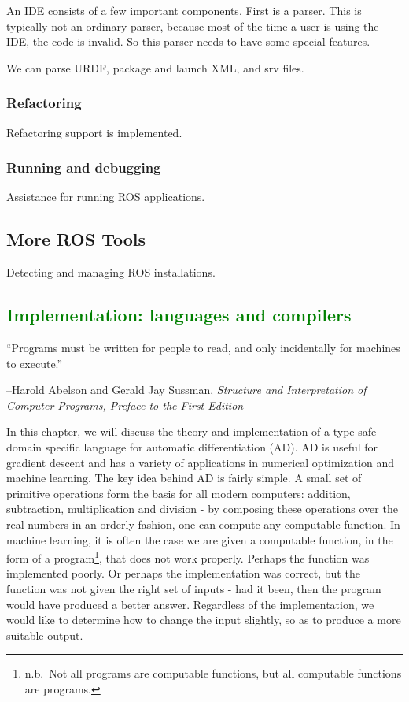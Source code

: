 \documentclass[12pt,initial,twoside,maitrise]{dms}
\newcommand{\mediumwell}[1]{\textcolor{green}{#1}}
\numberwithin{equation}{section}
\numberwithin{table}{chapter}
\numberwithin{figure}{chapter}
\begin{document}
An IDE consists of a few important components. First is a parser. This is typically not an ordinary parser, because most of the time a user is using the IDE, the code is invalid. So this parser needs to have some special features.

We can parse URDF, package and launch XML, and srv files.

\subsection{Refactoring}

Refactoring support is implemented.

\subsection{Running and debugging}

Assistance for running ROS applications.

\section{More ROS Tools}

Detecting and managing ROS installations.

\mediumwell{\chapter{Implementation: languages and compilers}\label{ch:kotlingrad}}

\setlength{\epigraphwidth}{0.5\textwidth}
\epigraph{``Programs must be written for people to read, and only incidentally for machines to execute.''}{\begin{flushright}--Harold Abelson and Gerald Jay Sussman, \textit{Structure and Interpretation of Computer Programs, Preface to the First Edition~\cite{abelson1996structure}}\end{flushright}}

In this chapter, we will discuss the theory and implementation of a type safe domain specific language for automatic differentiation (AD). AD is useful for gradient descent and has a variety of applications in numerical optimization and machine learning. The key idea behind AD is fairly simple. A small set of primitive operations form the basis for all modern computers: addition, subtraction, multiplication and division - by composing these operations over the real numbers in an orderly fashion, one can compute any computable function. In machine learning, it is often the case we are given a computable function, in the form of a program\footnote{n.b.\ Not all programs are computable functions, but all computable functions are programs.}, that does not work properly. Perhaps the function was implemented poorly. Or perhaps the implementation was correct, but the function was not given the right set of inputs - had it been, then the program would have produced a better answer. Regardless of the implementation, we would like to determine how to change the input slightly, so as to produce a more suitable output.
\end{document}
